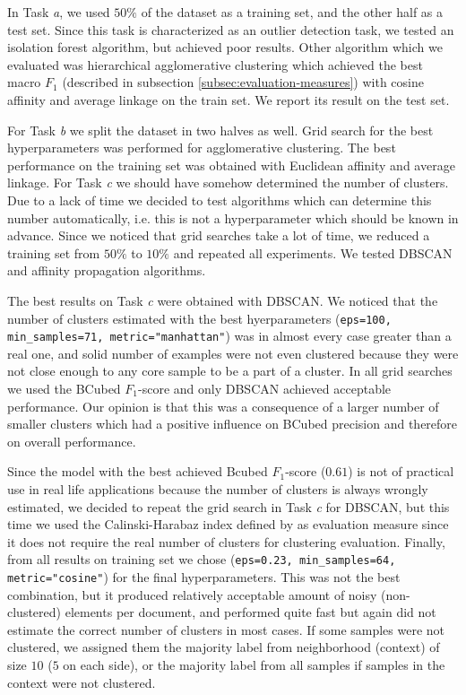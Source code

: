 \documentclass[10pt, a4paper]{article}
\begin{document}
In Task \emph{a}, we used $50\%$ of the dataset as a training set, and the other half as a test set. Since this task is characterized as an outlier detection task, we tested an isolation forest algorithm, but achieved poor results. Other algorithm which we evaluated was hierarchical agglomerative clustering which achieved the best macro $F_1$ (described in subsection \ref{subsec:evaluation-measures}) with cosine affinity and average linkage on the train set. We report its result on the test set.

For Task \emph{b} we split the dataset in two halves as well. Grid search for the best hyperparameters was performed for agglomerative clustering. The best performance on the training set was obtained with Euclidean affinity and average linkage. For Task \emph{c} we should have somehow determined the number of clusters. Due to a lack of time we decided to test algorithms which can determine this number automatically, i.e. this is not a hyperparameter which should be known in advance. Since we noticed that grid searches take a lot of time, we reduced a training set from $50\%$ to $10\%$ and repeated all experiments. We tested DBSCAN and affinity propagation algorithms.

The best results on Task \emph{c} were obtained with DBSCAN. We noticed that the number of clusters  estimated with the best hyerparameters (\texttt{eps=100, min\_samples=71, metric="manhattan"}) was in almost every case greater than a real one, and solid number of examples were not even clustered because they were not close enough to any core sample to be a part of a cluster. In all grid searches we used the BCubed $F_1$-score and only DBSCAN achieved acceptable performance. Our opinion is that this was a consequence of a larger number of smaller clusters which had a positive influence on BCubed precision and therefore on overall performance.
 
Since the model with the best achieved Bcubed $F_1$-score ($0.61$) is not of practical use in real life applications because the number of clusters is always wrongly estimated, we decided to repeat the grid search in Task \emph{c} for DBSCAN, but this time we used the Calinski-Harabaz index defined by \citet{calinski-1974} as evaluation measure since it does not require the real number of clusters for clustering evaluation. Finally, from all results on training set we chose (\texttt{eps=0.23, min\_samples=64, metric="cosine"}) for the final hyperparameters. This was not the best combination, but it produced relatively acceptable amount of noisy (non-clustered) elements per document, and performed quite fast but again did not estimate the correct number of clusters in most cases. If some samples were not clustered, we assigned them the majority label from neighborhood (context) of size $10$ ($5$ on each side), or the majority label from all samples if samples in the context were not clustered.
\end{document}
